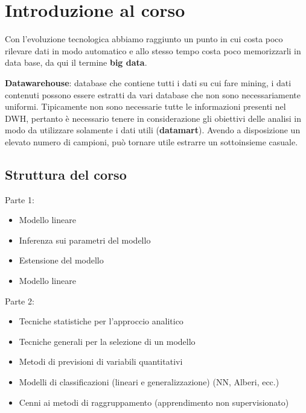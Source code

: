 \chapter{Introduzione al corso}\label{lezione-1---data-mining}

Con l'evoluzione tecnologica abbiamo raggiunto un punto in cui costa
poco rilevare dati in modo automatico e allo stesso tempo costa poco
memorizzarli in data base, da qui il termine \textbf{big data}.

\textbf{Datawarehouse}: database che contiene tutti i dati su cui fare
mining, i dati contenuti possono essere estratti da vari database che
non sono necessariamente uniformi. Tipicamente non sono necessarie tutte
le informazioni presenti nel DWH, pertanto è necessario tenere in
considerazione gli obiettivi delle analisi in modo da utilizzare
solamente i dati utili (\textbf{datamart}). Avendo a disposizione un
elevato numero di campioni, può tornare utile estrarre un sottoinsieme
casuale.

\section{Struttura del corso}\label{struttura-del-corso}

Parte 1:

\begin{itemize}
\item
  Modello lineare
\item
  Inferenza sui parametri del modello
\item
  Estensione del modello
\item
  Modello lineare
\end{itemize}

Parte 2:

\begin{itemize}
\item
  Tecniche statistiche per l'approccio analitico
\item
  Tecniche generali per la selezione di un modello
\item
  Metodi di previsioni di variabili quantitativi
\item
  Modelli di classificazioni (lineari e generalizzazione) (NN, Alberi,
  ecc.)
\item
  Cenni ai metodi di raggruppamento (apprendimento non supervisionato)
\end{itemize}

